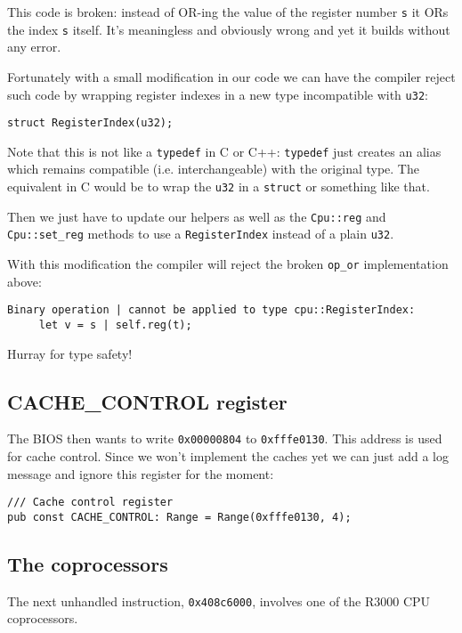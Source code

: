 \documentclass[a4paper]{article}
\newcommand{\code}[1] {\texttt{#1}}
\begin{document}
This code is broken: instead of OR-ing the value of the register
number \code{s} it ORs the index \code{s} itself. It's meaningless
and obviously wrong and yet it builds without any error.

Fortunately with a small modification in our code we can have the
compiler reject such code by wrapping register indexes in a new type
incompatible with \code{u32}:

\begin{lstlisting}
struct RegisterIndex(u32);
\end{lstlisting}

Note that this is not like a \code{typedef} in C or C++:
\code{typedef} just creates an alias which remains compatible
(i.e. interchangeable) with the original type. The equivalent in C
would be to wrap the \code{u32} in a \code{struct} or something like that.

Then we just have to update our helpers as well as the
\code{Cpu::reg} and \code{Cpu::set\_reg} methods to use a
\code{RegisterIndex} instead of a plain \code{u32}.

With this modification the compiler will reject the broken
\code{op\_or} implementation above:

\begin{verbatim}
Binary operation | cannot be applied to type cpu::RegisterIndex:
     let v = s | self.reg(t);
\end{verbatim}

Hurray for type safety!


\subsection{CACHE\_CONTROL register}

The BIOS then wants to write \code{0x00000804} to
\code{0xfffe0130}. This address is used for cache control. Since we
won't implement the caches yet we can just add a log message and
ignore this register for the moment:

\begin{lstlisting}
/// Cache control register
pub const CACHE_CONTROL: Range = Range(0xfffe0130, 4);
\end{lstlisting}

\subsection{The coprocessors}

The next unhandled instruction, \code{0x408c6000}, involves one of
the R3000 CPU coprocessors.
\end{document}
